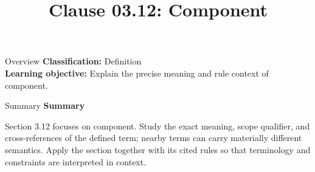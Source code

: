 \documentclass[10pt,letterpaper]{article}
\title{Clause 03.12: Component}
\author{}
\date{}
\begin{document}
\maketitle
\begin{CornellOverviewBox}{Overview}
\textbf{Classification:} Definition\\[2pt]
\textbf{Learning objective:} Explain the precise meaning and rule context of component.
\end{CornellOverviewBox}\begin{CornellSummaryBox}{Summary}
{\sffamily\bfseries\color{Accent} Summary}\par\vspace{3pt}Section 3.12 focuses on component. Study the exact meaning, scope qualifier, and cross-references of the defined term; nearby terms can carry materially different semantics. Apply the section together with its cited rules so that terminology and constraints are interpreted in context.
\end{CornellSummaryBox}
\end{document}
